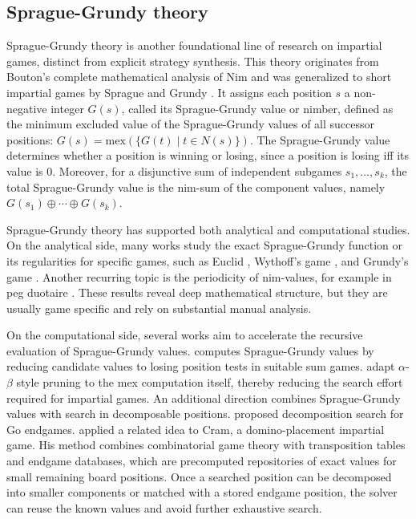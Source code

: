 \documentclass[review]{elsarticle}
\begin{document}
\subsection{Sprague-Grundy theory}

Sprague-Grundy theory is another foundational line of research on impartial games, distinct from explicit strategy synthesis. 
This theory originates from Bouton's complete mathematical analysis of Nim \cite{Bou1901} and was generalized to short impartial games by Sprague \cite{sprague1935} and Grundy \cite{grundy1939}. 
It assigns each position $s$ a non-negative integer $G(s)$, called its Sprague-Grundy value or nimber, defined as the minimum excluded value of the Sprague-Grundy values of all successor positions:
$G(s) = \text{mex}(\{G(t) \mid t \in N(s)\})$.
The Sprague-Grundy value determines whether a position is winning or losing, since a position is losing iff its value is $0$.
Moreover, for a disjunctive sum of independent subgames $s_1,\ldots,s_k$, the total Sprague-Grundy value is the nim-sum of the component values, namely $G(s_1) \oplus \cdots \oplus G(s_k)$.

Sprague-Grundy theory has supported both analytical and computational studies. 
On the analytical side, many works study the exact Sprague-Grundy function or its regularities for specific games, such as Euclid \cite{cairns2011,nivasch2006}, Wythoff's game \cite{blass1990}, and Grundy's game \cite{guy1956g}. 
Another recurring topic is the periodicity of nim-values, for example in peg duotaire \cite{grossman2004}. 
These results reveal deep mathematical structure, but they are usually game specific and rely on substantial manual analysis.

On the computational side, several works aim to accelerate the recursive evaluation of Sprague-Grundy values. 
\citet{lemoine2012} computes Sprague-Grundy values by reducing candidate values to losing position tests in suitable sum games. 
\citet{BelM2020} adapt $\alpha$-$\beta$ style pruning to the mex computation itself, thereby reducing the search effort required for impartial games. 
An additional direction combines Sprague-Grundy values with search in decomposable positions. 
\citet{muller1999} proposed decomposition search for Go endgames. 
\citet{uiterwijk2019} applied a related idea to Cram, a domino-placement impartial game. 
His method combines combinatorial game theory with transposition tables and endgame databases, which are precomputed repositories of exact values for small remaining board positions. 
Once a searched position can be decomposed into smaller components or matched with a stored endgame position, the solver can reuse the known values and avoid further exhaustive search. 
\end{document}
